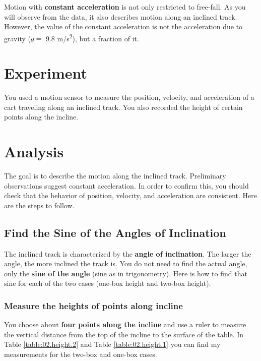 Motion with \textbf{constant acceleration} is not only restricted to free-fall. As you will observe from the data, it also describes motion along an inclined track. However, the value of the constant acceleration is not the acceleration due to gravity ($g = $ 9.8 m/s\textsuperscript{2}), but a fraction of it.
%
\section{Experiment}
%
You used a motion sensor to measure the position, velocity, and acceleration of a cart traveling along an inclined track. You also recorded the height of certain points along the incline.
%
\section{Analysis}
%
The goal is to describe the motion along the inclined track. Preliminary observations suggest constant acceleration. In order to confirm this, you should check that the behavior of position, velocity, and acceleration are consistent. Here are the steps to follow.
%
\subsection{Find the Sine of the Angles of Inclination}
%
The inclined track is characterized by the \textbf{angle of inclination}. The larger the angle, the more inclined the track is. You do not need to find the actual angle, only the \textbf{sine of the angle} (sine as in trigonometry). Here is how to find that sine for each of the two cases (one-box height and two-box height).
%
\subsubsection{Measure the heights of points along incline}
%
You choose about \textbf{four points along the incline} and use a ruler to measure the vertical distance from the top of the incline to the surface of the table. In Table \ref{table:02.height.2} and Table \ref{table:02.height.1} you can find my measurements for the two-box and one-box cases.
%
